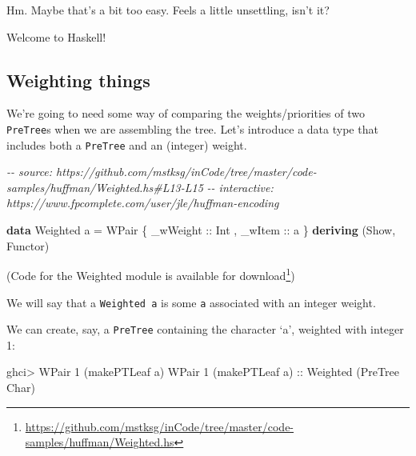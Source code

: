 \documentclass[]{article}
\newenvironment{Shaded}{}{}
\newcommand{\CharTok}[1]{\textcolor[rgb]{0.25,0.44,0.63}{#1}}
\newcommand{\CommentTok}[1]{\textcolor[rgb]{0.38,0.63,0.69}{\textit{#1}}}
\newcommand{\DataTypeTok}[1]{\textcolor[rgb]{0.56,0.13,0.00}{#1}}
\newcommand{\DecValTok}[1]{\textcolor[rgb]{0.25,0.63,0.44}{#1}}
\newcommand{\KeywordTok}[1]{\textcolor[rgb]{0.00,0.44,0.13}{\textbf{#1}}}
\newcommand{\NormalTok}[1]{#1}
\newcommand{\OperatorTok}[1]{\textcolor[rgb]{0.40,0.40,0.40}{#1}}
\newcommand{\OtherTok}[1]{\textcolor[rgb]{0.00,0.44,0.13}{#1}}
\renewcommand{\href}[2]{#2\footnote{\url{#1}}}
\begin{document}
Hm. Maybe that's a bit too easy. Feels a little unsettling, isn't it?

Welcome to Haskell!

\subsection{Weighting things}\label{weighting-things}

We're going to need some way of comparing the weights/priorities of two
\texttt{PreTree}s when we are assembling the tree. Let's introduce a data type
that includes both a \texttt{PreTree} and an (integer) weight.

\begin{Shaded}
\begin{Highlighting}[]
\CommentTok{{-}{-} source: https://github.com/mstksg/inCode/tree/master/code{-}samples/huffman/Weighted.hs\#L13{-}L15}
\CommentTok{{-}{-} interactive: https://www.fpcomplete.com/user/jle/huffman{-}encoding}

\KeywordTok{data} \DataTypeTok{Weighted}\NormalTok{ a }\OtherTok{=} \DataTypeTok{WPair}\NormalTok{ \{}\OtherTok{ \_wWeight ::} \DataTypeTok{Int}
\NormalTok{                        ,}\OtherTok{ \_wItem   ::}\NormalTok{ a}
\NormalTok{                        \} }\KeywordTok{deriving}\NormalTok{ (}\DataTypeTok{Show}\NormalTok{, }\DataTypeTok{Functor}\NormalTok{)}
\end{Highlighting}
\end{Shaded}

(Code for the Weighted module is
\href{https://github.com/mstksg/inCode/tree/master/code-samples/huffman/Weighted.hs}{available
for download})

We will say that a \texttt{Weighted\ a} is some \texttt{a} associated with an
integer weight.

We can create, say, a \texttt{PreTree} containing the character `a', weighted
with integer 1:

\begin{Shaded}
\begin{Highlighting}[]
\NormalTok{ghci}\OperatorTok{\textgreater{}} \DataTypeTok{WPair} \DecValTok{1}\NormalTok{ (makePTLeaf }\CharTok{\textquotesingle{}a\textquotesingle{}}\NormalTok{)}
\DataTypeTok{WPair} \DecValTok{1}\NormalTok{ (makePTLeaf }\CharTok{\textquotesingle{}a\textquotesingle{}}\NormalTok{)}\OtherTok{ ::} \DataTypeTok{Weighted}\NormalTok{ (}\DataTypeTok{PreTree} \DataTypeTok{Char}\NormalTok{)}
\end{Highlighting}
\end{Shaded}
\end{document}
